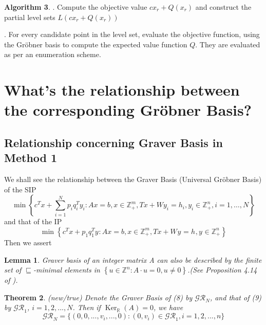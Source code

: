 \documentclass{article}
\theoremstyle{plain}
\newtheorem{theorem}{Theorem}[section]
\newtheorem{lemma}[theorem]{Lemma}
\theoremstyle{definition}
\newtheorem{algorithm}[theorem]{Algorithm}
\begin{document}
\begin{algorithm}
\noindent {}. Compute the objective value  $c x_{r}+Q\left(x_{r}\right) $ and construct the partial level sets  $L\left(c x_{r}+Q\left(x_{r}\right)\right) $ 

\noindent {}. For every candidate point in the level set, evaluate the objective function, using the Gröbner basis to compute the expected value function  $Q$. They are evaluated as per an enumeration scheme.

\section{What's the relationship between the corresponding Gröbner Basis?}
\subsection{Relationship concerning Graver Basis in Method 1}
We shall see the relationship between the Graver Basis (Universal Gröbner Basis) of the SIP 
\begin{equation}
\min \left\{c^{T} x+\sum_{i=1}^{N} p_{i} q_{i}^{T} y_{i}: A x= b, x  \in \mathbb{Z}_{+}^{m}, T x+W y_{i}=h_{i}, y_{i}  \in \mathbb{Z}_{+}^{n}, i=1, \ldots, N\right\}
\end{equation}
and that of the IP
\begin{equation}
\min \left\{c^{T} x+ p_{1} q_{1}^{T} y_{}: A x = b, x  \in \mathbb{Z}_{+}^{m}, T x+W_{} y_{}=h_{}, y_{}  \in \mathbb{Z}_{+}^{n} \right\}
\end{equation}
Then we assert \\

\begin{lemma}  Graver basis of an integer matrix  A can also be described by the finite set  of  $\sqsubseteq$-minimal elements in  $\left\{u \in \mathbb{Z}^{n}: A \cdot u=0,u\neq 0\right\}$.(See Proposition 4.14 of \cite{ref10}).\end{lemma}

\begin{theorem} (new/true) Denote the  Graver Basis of  (8) by $\mathcal{GR}_{N}$, and that of (9) by $\mathcal{GR}_{1}$, $i=1,2,...,N$. Then if $\operatorname{Ker}_{\mathbb{R}}(A)=0$, we have $$\mathcal{GR}_{N}=\{(0,0,...,v_i,...,0):(0,v_i)\in \mathcal{GR}_{1},i=1,2,...,n\}$$\end{theorem}


\end{algorithm}
\end{document}
